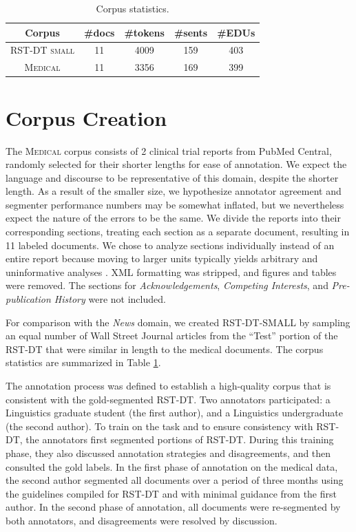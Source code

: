 \begin{table}[t]
\centering
\small
\begin{tabular}{ccccc}
\toprule
Corpus & \#docs  & \#tokens     & \#sents     & \#EDUs    \\ 
\midrule
\textsc{RST-DT small} &11  &4009  &159  &403  \\
                                  \textsc{Medical} & 11 &3356  &169  &399\\             \bottomrule
\end{tabular}
\vspace{-0.6em}
\caption{Corpus statistics.}
\label{tab:cross_domain_corpus}
\end{table}

\section{Corpus Creation}

 The \textsc{Medical} corpus consists of 2 clinical trial reports from PubMed Central, randomly selected for their shorter lengths for ease of annotation. We expect the language and discourse to be representative of this domain, despite the shorter length. As a result of the smaller size, we hypothesize annotator agreement and segmenter performance numbers may be somewhat inflated, but we nevertheless expect the nature of the errors to be the same. We divide the reports into their corresponding sections, treating each section as a separate document, resulting in 11 labeled documents. We chose to analyze sections individually instead of an entire report because moving to larger units typically yields arbitrary and uninformative analyses \cite{Taboada:2006}. XML formatting was stripped, and figures and tables were removed. The sections for \textit{Acknowledgements}, \textit{Competing Interests}, and \textit{Pre-publication History} were not included. 
 
 For comparison with the \textit{News} domain, we created \textsc{RST-DT-SMALL} by sampling an equal number of Wall Street Journal articles from the ``Test'' portion of the RST-DT that were similar in length to the medical documents. The corpus statistics are summarized in Table \ref{tab:cross_domain_corpus}.

\medskip
{} The annotation process was defined to establish a high-quality corpus that is consistent with the gold-segmented RST-DT. Two annotators participated: a Linguistics graduate student (the first author), and a Linguistics undergraduate (the second author). To train on the task and to ensure consistency with RST-DT, the annotators first segmented portions of RST-DT. During this training phase, they also discussed annotation strategies and disagreements, and then consulted the gold labels. In the first phase of annotation on the medical data, the second author segmented all documents over a period of three months using the guidelines compiled for RST-DT \cite{Carlson:2001b} and with minimal guidance from the first author. In the second phase of annotation, all documents were re-segmented by both annotators, and disagreements were resolved by discussion.

